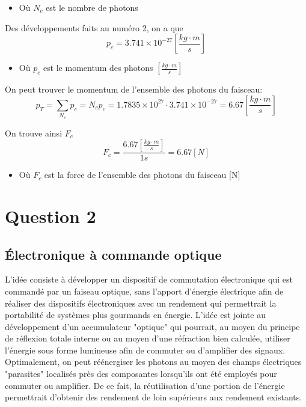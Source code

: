 \begin{itemize}
\item Où $N_c$ est le nombre de photons
\end{itemize}

Des développements faits au numéro 2, on a que
\begin{equation}
p_c = 3.741\times 10^{-27} \left[\frac{kg \cdot m}{s}\right]
\end{equation}
\begin{itemize}
\item Où $p_c$ est le momentum des photons $\left[\frac{kg \cdot m}{s}\right]$
\end{itemize}

On peut trouver le momentum de l'ensemble des photons du faisceau:
\begin{equation}
p_{T} = \sum_{N_c} p_c = N_cp_c = 1.7835\times 10^{27} \cdot 3.741\times 10^{-27} = 6.67\left[\frac{kg \cdot m}{s}\right]
\end{equation}


On trouve ainsi $F_c$
\begin{equation}
F_{c} = \frac{6.67 \left[\frac{kg \cdot m}{s}\right]}{1 s} = 6.67\left[N\right]
\end{equation}
\begin{itemize}
\item Où $F_{c}$ est la force de l'ensemble des photons du faisceau [N]
\end{itemize}

\chapter{Question 2}
\section{Électronique à commande optique}
L'idée consiste à développer un dispositif de commutation électronique qui est commandé par un faiseau optique, sans l'apport d'énergie électrique afin de réaliser des dispositifs électroniques avec un rendement qui permettrait la portabilité de systèmes plus gourmands en énergie. L'idée est jointe au développement d'un accumulateur "optique" qui pourrait, au moyen du principe de réflexion totale interne ou au moyen d'une réfraction bien calculée, utiliser l'énergie sous forme lumineuse afin de commuter ou d'amplifier des signaux. Optimalement, on peut réénergiser les photons au moyen des champs électriques "parasites" localisés près des composantes lorsqu'ils ont été employés pour commuter ou amplifier. De ce fait, la réutilisation d'une portion de l'énergie permettrait d'obtenir des rendement de loin supérieurs aux rendement existants.
